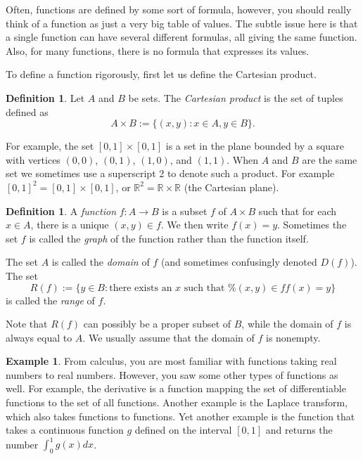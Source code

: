 \documentclass[12pt]{book}
\newcommand{\R}{{\mathbb{R}}}
\newcommand{\myindex}[1]{#1\index{#1}}
\theoremstyle{plain}
\theoremstyle{remark}
\theoremstyle{definition}
\newtheorem{defn}[thm]{Definition}
\theoremstyle{exercise}
\theoremstyle{example}
\newtheorem{example}[thm]{Example}
\begin{document}
Often, functions are defined by some sort of
formula, however, you should really think of a function as just a very big
table of values.
The subtle issue here is that a single function can have several different
formulas, all giving the same function.  Also, for many functions, there is
no formula that expresses its values.

To define a function rigorously, first let us define the Cartesian product.

\begin{defn}
Let $A$ and $B$ be sets.  The \emph{\myindex{Cartesian product}}
is the set of tuples defined as
\begin{equation*}
A \times B :=
\{ (x,y) : x \in A, y \in B \} .
\end{equation*}
\end{defn}

For example, the set $[0,1] \times [0,1]$ is a set in the plane
bounded by a square with vertices $(0,0)$, $(0,1)$, $(1,0)$, and $(1,1)$.
When $A$ and $B$ are the same set we sometimes use a superscript 2 to denote
such a product.  For example $[0,1]^2 = 
[0,1] \times [0,1]$, or $\R^2 = \R \times \R$ (the Cartesian plane).

\begin{defn}
A \emph{function} $f \colon A \to B$ is a subset $f$ of $A \times B$
such that for each $x \in A$, there is a unique $(x,y) \in f$.  We then
write $f(x) = y$.  Sometimes
the set $f$ is called the \emph{\myindex{graph}} of the function rather than
the function itself.

The set $A$ is called the \emph{\myindex{domain}} of $f$ (and
sometimes confusingly denoted $D(f)$).  The set
\begin{equation*}
R(f) := \{ y \in B : \text{there exists an $x$ such that
$f(x)=y$
} \}
\end{equation*}
is called the \emph{\myindex{range}} of $f$.
\end{defn}

Note that $R(f)$ can possibly be a proper subset of $B$,
while the domain of $f$ is always equal to $A$.  We usually 
assume that the domain of $f$ is nonempty.

\begin{example}
From calculus, you are most familiar with functions taking real numbers to real
numbers.  However, you saw some other types of functions as well.  For
example, the derivative is a function mapping the set of
differentiable functions to the set of all functions.
Another example is the Laplace transform, which also
takes functions to functions.  Yet another example is the function that takes
a continuous function $g$ defined on the interval $[0,1]$ and returns the
number $\int_0^1 g(x) dx$.
\end{example}
\end{document}
